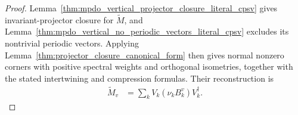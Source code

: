 \begin{proof}
    \leanok
    Lemma~\ref{thm:mpdo_vertical_projector_closure_literal_cpsv} gives
    invariant-projector closure for $\widetilde M$, and
    Lemma~\ref{thm:mpdo_vertical_no_periodic_vectors_literal_cpsv} excludes
    its nontrivial periodic vectors. Applying
    Lemma~\ref{thm:projector_closure_canonical_form} then gives normal
    nonzero corners with positive spectral weights and orthogonal isometries,
    together with the stated intertwining and compression formulas. Their
    reconstruction is
    \begin{align}
        \widetilde M_v
         & =\sum_kV_k(\nu_kB_k^v)V_k^\dagger.
        \label{eq:cpsv_prop_4_13_normal_corners}
    \end{align}
\end{proof}

